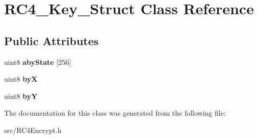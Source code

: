 \section{RC4\_\-Key\_\-Struct Class Reference}
\label{classRC4__Key__Struct}
\subsection*{Public Attributes}
\begin{DoxyCompactItemize}
\item 
uint8 {\bfseries abyState} [256]\label{classRC4__Key__Struct_a93a0411a8b5c95b71d57c6c409dd3753}

\item 
uint8 {\bfseries byX}\label{classRC4__Key__Struct_ab3d9cd46fae53da11d263a334036a8cd}

\item 
uint8 {\bfseries byY}\label{classRC4__Key__Struct_ae10e115e55e77a73cbed9a9ef7009510}

\end{DoxyCompactItemize}


The documentation for this class was generated from the following file:\begin{DoxyCompactItemize}
\item 
src/RC4Encrypt.h\end{DoxyCompactItemize}
